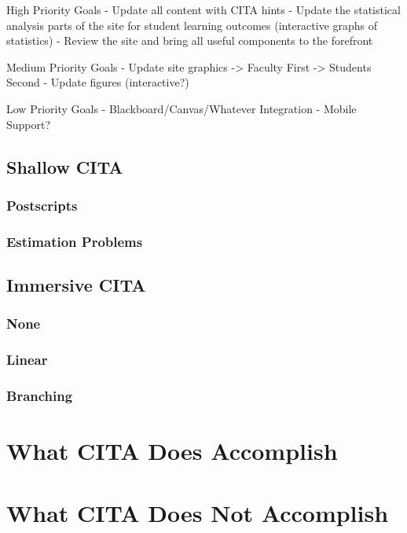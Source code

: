 High Priority Goals
- Update all content with CITA hints
- Update the statistical analysis parts of the site for student learning outcomes (interactive graphs of statistics)
- Review the site and bring all useful components to the forefront

Medium Priority Goals
- Update site graphics
-> Faculty First
-> Students Second
- Update figures (interactive?)

Low Priority Goals
- Blackboard/Canvas/Whatever Integration
- Mobile Support?

\subsection{Shallow CITA}


\subsubsection{Postscripts}


\subsubsection{Estimation Problems}

\subsection{Immersive CITA}
\subsubsection{None}
\subsubsection{Linear}
\subsubsection{Branching}

\section{What CITA Does Accomplish}

\section{What CITA Does Not Accomplish}

